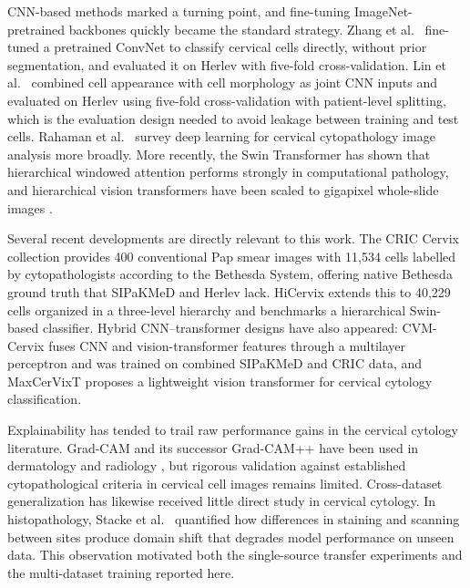 \documentclass[runningheads]{llncs}
\begin{document}
CNN-based methods marked a turning point, and fine-tuning ImageNet-pretrained backbones quickly became the standard strategy. Zhang et al.\ \cite{zhang2017deeppap} fine-tuned a pretrained ConvNet to classify cervical cells directly, without prior segmentation, and evaluated it on Herlev with five-fold cross-validation. Lin et al.\ \cite{lin2019} combined cell appearance with cell morphology as joint CNN inputs and evaluated on Herlev using five-fold cross-validation with patient-level splitting, which is the evaluation design needed to avoid leakage between training and test cells. Rahaman et al.\ \cite{rahaman2020} survey deep learning for cervical cytopathology image analysis more broadly. More recently, the Swin Transformer \cite{liu2021swin} has shown that hierarchical windowed attention performs strongly in computational pathology, and hierarchical vision transformers have been scaled to gigapixel whole-slide images \cite{chen2022hipt}.

Several recent developments are directly relevant to this work. The CRIC Cervix collection \cite{rezende2021cric} provides 400 conventional Pap smear images with 11,534 cells labelled by cytopathologists according to the Bethesda System, offering native Bethesda ground truth that SIPaKMeD and Herlev lack. HiCervix \cite{cai2024hicervix} extends this to 40,229 cells organized in a three-level hierarchy and benchmarks a hierarchical Swin-based classifier. Hybrid CNN--transformer designs have also appeared: CVM-Cervix \cite{liu2022cvmcervix} fuses CNN and vision-transformer features through a multilayer perceptron and was trained on combined SIPaKMeD and CRIC data, and MaxCerVixT \cite{pacal2024maxcervixt} proposes a lightweight vision transformer for cervical cytology classification.

Explainability has tended to trail raw performance gains in the cervical cytology literature. Grad-CAM \cite{selvaraju2017gradcam} and its successor Grad-CAM++ \cite{chattopadhay2018} have been used in dermatology \cite{esteva2017} and radiology \cite{rajpurkar2017}, but rigorous validation against established cytopathological criteria in cervical cell images remains limited. Cross-dataset generalization has likewise received little direct study in cervical cytology. In histopathology, Stacke et al.\ \cite{stacke2021domainshift} quantified how differences in staining and scanning between sites produce domain shift that degrades model performance on unseen data. This observation motivated both the single-source transfer experiments and the multi-dataset training reported here.
\end{document}
